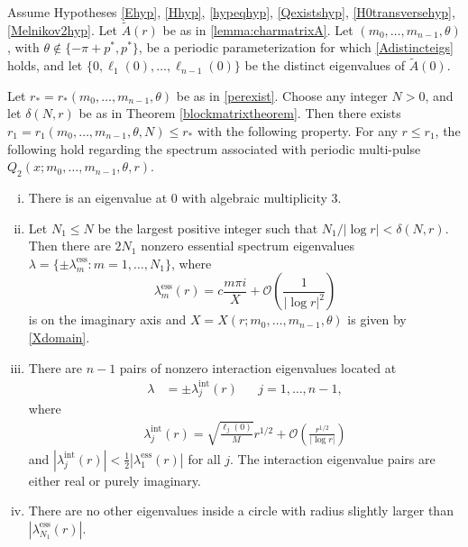 \documentclass[thesis.tex]{subfiles}
\begin{document}
\begin{theorem}\label{theorem:multieigs}
Assume Hypotheses \ref{Ehyp}, \ref{Hhyp}, \ref{hypeqhyp}, \ref{Qexistshyp}, \ref{H0transversehyp}, \ref{Melnikov2hyp}. Let $\tilde{A}(r)$ be as in \cref{lemma:charmatrixA}. Let $(m_0, \dots, m_{n-1}, \theta)$, with $\theta \notin \{-\pi + p^*, p^* \}$, be a periodic parameterization for which \cref{Adistincteigs} holds, and let $\{ 0, \ell_1(0), \dots, \ell_{n-1}(0)\}$ be the distinct eigenvalues of $\tilde{A}(0)$. 

Let $r_* = r_*(m_0, \dots, m_{n-1}, \theta)$ be as in \cref{perexist}. Choose any integer $N > 0$, and let $\delta(N,r)$ be as in Theorem \ref{blockmatrixtheorem}. Then there exists $r_1 = r_1(m_0, \dots, m_{n-1}, \theta, N) \leq r_*$ with the following property. For any $r \leq r_1$, the following hold regarding the spectrum associated with periodic multi-pulse $Q_2(x; m_0, \dots, m_{n-1}, \theta, r)$.

\begin{enumerate}[(i)]
\item There is an eigenvalue at 0 with algebraic multiplicity 3.
\item Let $N_1 \leq N$ be the largest positive integer such that $N_1/|\log r| < \delta(N,r)$. Then there are $2N_1$ nonzero essential spectrum eigenvalues $\lambda = \{ \pm \lambda_m^{\text{ess}} : m = 1, \dots, N_1 \}$, where
\[
\lambda_m^{\text{ess}}(r) = c \frac{m \pi i}{X}+  \mathcal{O}\left( \frac{1}{|\log r|^2} \right)
\]
is on the imaginary axis and $X = X(r; m_0, \dots, m_{n-1}, \theta)$ is given by \cref{Xdomain}.

\item There are $n - 1$ pairs of nonzero interaction eigenvalues located at
\begin{align*}
\lambda &= \pm \lambda^{\text{int}}_j(r) && j = 1, \dots, n-1,
\end{align*}
where
\begin{align*}
\lambda^{\text{int}}_j(r) = \sqrt{\frac{\ell_j(0)}{M}}r^{1/2} + \mathcal{O}\left( \frac{r^{1/2}}{|\log r|}\right)
\end{align*}
and $|\lambda^{\text{int}}_j(r)| < \frac{1}{2}|\lambda_1^{\text{ess}}(r)|$ for all $j$. The interaction eigenvalue pairs are either real or purely imaginary.

\item There are no other eigenvalues inside a circle with radius slightly larger than $|\lambda_{N_1}^{\text{ess}}(r)|$.

\end{enumerate}
\end{theorem}
\end{document}
